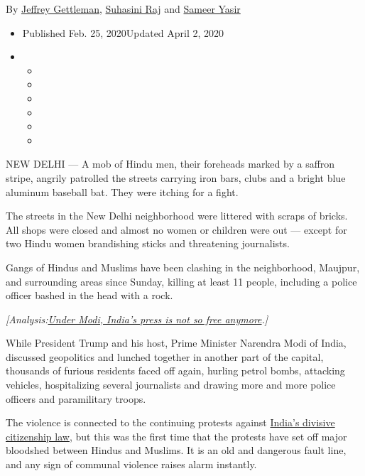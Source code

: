 By \href{https://www.nytimes.com/by/jeffrey-gettleman}{Jeffrey
Gettleman}, \href{https://www.nytimes.com/by/suhasini-raj}{Suhasini Raj}
and \href{https://www.nytimes.com/by/sameer-yasir}{Sameer Yasir}

\begin{itemize}
\item
  Published Feb. 25, 2020Updated April 2, 2020
\item
  \begin{itemize}
  \item
  \item
  \item
  \item
  \item
  \item
  \end{itemize}
\end{itemize}

NEW DELHI --- A mob of Hindu men, their foreheads marked by a saffron
stripe, angrily patrolled the streets carrying iron bars, clubs and a
bright blue aluminum baseball bat. They were itching for a fight.

The streets in the New Delhi neighborhood were littered with scraps of
bricks. All shops were closed and almost no women or children were out
--- except for two Hindu women brandishing sticks and threatening
journalists.

Gangs of Hindus and Muslims have been clashing in the neighborhood,
Maujpur, and surrounding areas since Sunday, killing at least 11 people,
including a police officer bashed in the head with a rock.

\emph{{[}Analysis:}\href{http://www.nytimes.com/2020/04/02/world/asia/modi-india-press-media.html}{\emph{Under
Modi, India's press is not so free anymore}}\emph{.{]}}

While President Trump and his host, Prime Minister Narendra Modi of
India, discussed geopolitics and lunched together in another part of the
capital, thousands of furious residents faced off again, hurling petrol
bombs, attacking vehicles, hospitalizing several journalists and drawing
more and more police officers and paramilitary troops.

The violence is connected to the continuing protests against
\href{https://www.nytimes.com/2019/12/16/world/asia/india-citizenship-protests.html}{India's
divisive citizenship law}, but this was the first time that the protests
have set off major bloodshed between Hindus and Muslims. It is an old
and dangerous fault line, and any sign of communal violence raises alarm
instantly.

